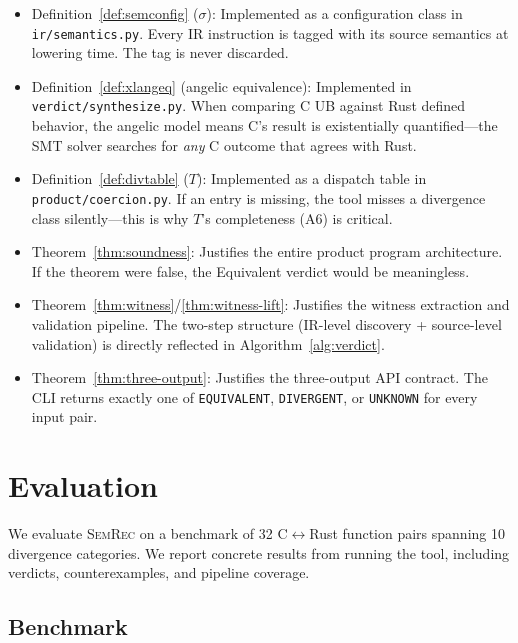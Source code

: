 \documentclass[11pt]{article}
\newcommand{\SemConfig}{\sigma}
\begin{document}
\begin{itemize}[leftmargin=*]
  \item Definition~\ref{def:semconfig} ($\SemConfig$): Implemented as a configuration class in \texttt{ir/semantics.py}. Every IR instruction is tagged with its source semantics at lowering time. The tag is never discarded.
  \item Definition~\ref{def:xlangeq} (angelic equivalence): Implemented in \texttt{verdict/synthesize.py}. When comparing C UB against Rust defined behavior, the angelic model means C's result is existentially quantified---the SMT solver searches for \emph{any} C outcome that agrees with Rust.
  \item Definition~\ref{def:divtable} ($T$): Implemented as a dispatch table in \texttt{product/coercion.py}. If an entry is missing, the tool misses a divergence class silently---this is why $T$'s completeness (A6) is critical.
  \item Theorem~\ref{thm:soundness}: Justifies the entire product program architecture. If the theorem were false, the Equivalent verdict would be meaningless.
  \item Theorem~\ref{thm:witness}/\ref{thm:witness-lift}: Justifies the witness extraction and validation pipeline. The two-step structure (IR-level discovery + source-level validation) is directly reflected in Algorithm~\ref{alg:verdict}.
  \item Theorem~\ref{thm:three-output}: Justifies the three-output API contract. The CLI returns exactly one of \texttt{EQUIVALENT}, \texttt{DIVERGENT}, or \texttt{UNKNOWN} for every input pair.
\end{itemize}


\section{Evaluation}
\label{sec:eval}

We evaluate \textsc{SemRec} on a benchmark of 32 C$\leftrightarrow$Rust function pairs spanning 10 divergence categories. We report concrete results from running the tool, including verdicts, counterexamples, and pipeline coverage.

\subsection{Benchmark}
\label{sec:eval-benchmarks}
\end{document}
